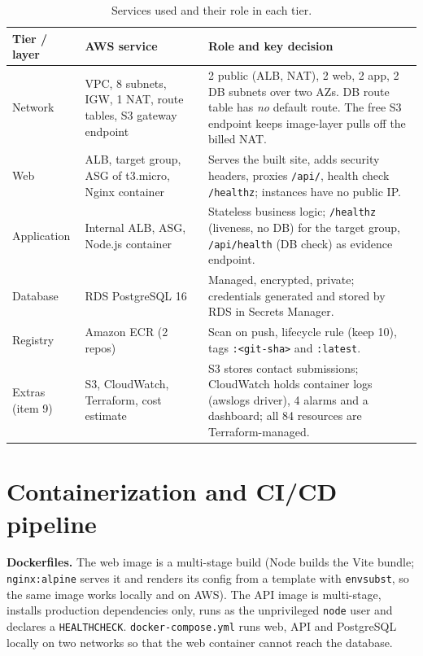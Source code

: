 \documentclass[10pt,a4paper]{article}
\begin{document}
\begin{table}[ht]
\centering\small
\begin{tabularx}{\textwidth}{@{}l L{3.7cm} X@{}}
\toprule
\textbf{Tier / layer} & \textbf{AWS service} & \textbf{Role and key decision}\\
\midrule
Network & VPC, 8 subnets, IGW, 1 NAT, route tables, S3 gateway endpoint &
 2 public (ALB, NAT), 2 web, 2 app, 2 DB subnets over two AZs. DB route table has \emph{no} default route. The free S3 endpoint keeps image-layer pulls off the billed NAT.\\
Web & ALB, target group, ASG of t3.micro, Nginx container &
 Serves the built site, adds security headers, proxies \texttt{/api/}, health check \texttt{/healthz}; instances have no public IP.\\
Application & Internal ALB, ASG, Node.js container &
 Stateless business logic; \texttt{/healthz} (liveness, no DB) for the target group, \texttt{/api/health} (DB check) as evidence endpoint.\\
Database & RDS PostgreSQL 16 &
 Managed, encrypted, private; credentials generated and stored by RDS in Secrets Manager.\\
Registry & Amazon ECR (2 repos) & Scan on push, lifecycle rule (keep 10), tags \texttt{:<git-sha>} and \texttt{:latest}.\\
Extras (item 9) & S3, CloudWatch, Terraform, cost estimate &
 S3 stores contact submissions; CloudWatch holds container logs (awslogs driver), 4 alarms and a dashboard; all 84 resources are Terraform-managed.\\
\bottomrule
\end{tabularx}
\caption{Services used and their role in each tier.}
\end{table}

\section{Containerization and CI/CD pipeline}
\textbf{Dockerfiles.} The web image is a multi-stage build (Node builds the Vite bundle; \texttt{nginx:alpine} serves it
and renders its config from a template with \texttt{envsubst}, so the same image works locally and on AWS).
The API image is multi-stage, installs production dependencies only, runs as the unprivileged \texttt{node} user and
declares a \texttt{HEALTHCHECK}. \texttt{docker-compose.yml} runs web, API and PostgreSQL locally on two networks so that
the web container cannot reach the database.
\end{document}
